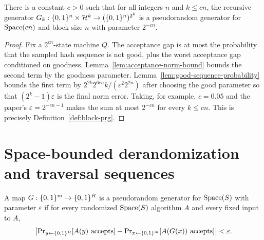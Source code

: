 \begin{lemma}
  \label{lem:generator-block-prg}
  There is a constant $c>0$ such that for all integers $n$ and $k\le cn$, the
  recursive generator $G_k:\{0,1\}^n\times\mathcal{H}^k\to(\{0,1\}^n)^{2^k}$ is a
  pseudorandom generator for $\operatorname{Space}(cn)$ and block size $n$ with parameter
  $2^{-cn}$.
\end{lemma}
\begin{proof}
  Fix a $2^{cn}$-state machine $Q$. The acceptance gap is at most the
  probability that the sampled hash sequence is not good, plus the worst
  acceptance gap conditioned on goodness. Lemma~\ref{lem:acceptance-norm-bound}
  bounds the second term by the goodness parameter. Lemma~\ref{lem:good-sequence-probability}
  bounds the first term by $2^{2k}2^{6cn}k/(\varepsilon^2 2^{2n})$ after
  choosing the good parameter so that $(2^k-1)\varepsilon$ is the final norm
  error. Taking, for example, $c=0.05$ and the paper's
  $\varepsilon=2^{-cn-1}$ makes the sum at most $2^{-cn}$ for every
  $k\le cn$. This is precisely Definition~\ref{def:block-prg}.
\end{proof}

\chapter{Space-bounded derandomization and traversal sequences}

\begin{definition}
  \label{def:space-prg}
  A map $G:\{0,1\}^m\to\{0,1\}^R$ is a pseudorandom generator for $\operatorname{Space}(S)$ with
  parameter $\varepsilon$ if for every randomized $\operatorname{Space}(S)$ algorithm $A$ and
  every fixed input to $A$,
  \[
    \left|\operatorname{Pr}_{y\leftarrow\{0,1\}^R}[A(y)\text{ accepts}]
      -\operatorname{Pr}_{x\leftarrow\{0,1\}^m}[A(G(x))\text{ accepts}]\right|
    <\varepsilon .
  \]
\end{definition}

